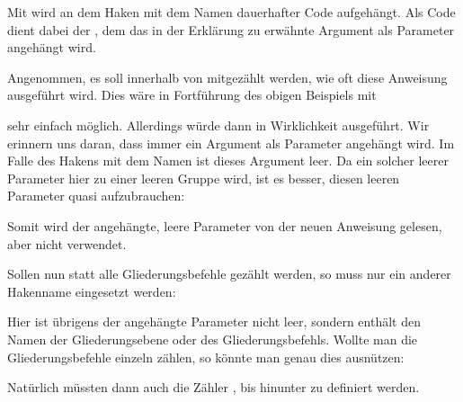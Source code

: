 \begin{Declaration}
\end{Declaration}
Mit  wird an
dem Haken mit dem Namen  dauerhafter Code
aufgehängt. Als Code dient dabei der , dem das in der Erklärung
zu  erwähnte Argument als Parameter
angehängt wird.
\begin{Example}
  Angenommen, es soll innerhalb von  mitgezählt werden, wie oft
  diese Anweisung ausgeführt wird. Dies wäre in Fortführung des obigen
  Beispiels mit
\begin{lstcode}
              {}
\end{lstcode}
  sehr einfach möglich. Allerdings würde dann in Wirklichkeit
  \PParameter{} ausgeführt. Wir
  erinnern uns daran, dass immer ein Argument als Parameter angehängt wird.
  Im Falle des Hakens mit dem Namen  ist
  dieses Argument leer. Da ein solcher leerer Parameter hier zu einer leeren
  Gruppe wird, ist es besser, diesen leeren Parameter quasi aufzubrauchen:
\begin{lstcode}
  \newcommand*{\stepcountergobble}[2]{%
    \stepcounter{#1}%
  }
              {}
\end{lstcode}
  Somit wird der angehängte, leere Parameter von der neuen Anweisung
   gelesen, aber nicht verwendet.

  Sollen nun statt  alle Gliederungsbefehle gezählt werden, so
  muss nur ein anderer Hakenname eingesetzt werden:
\begin{lstcode}
              {}
\end{lstcode}
  Hier ist übrigens der angehängte Parameter nicht leer, sondern enthält den
  Namen der Gliederungsebene oder des Gliederungsbefehls. Wollte man die
  Gliederungsbefehle einzeln zählen, so könnte man genau dies ausnützen:
\begin{lstcode}
  \newcommand*{\stepZaehler}[1]{%
    \stepcounter{#1Zaehler}%
  }
              {\stepZaehler}
\end{lstcode}
  Natürlich müssten dann auch die Zähler ,
   bis hinunter zu 
  definiert werden.
\end{Example}

